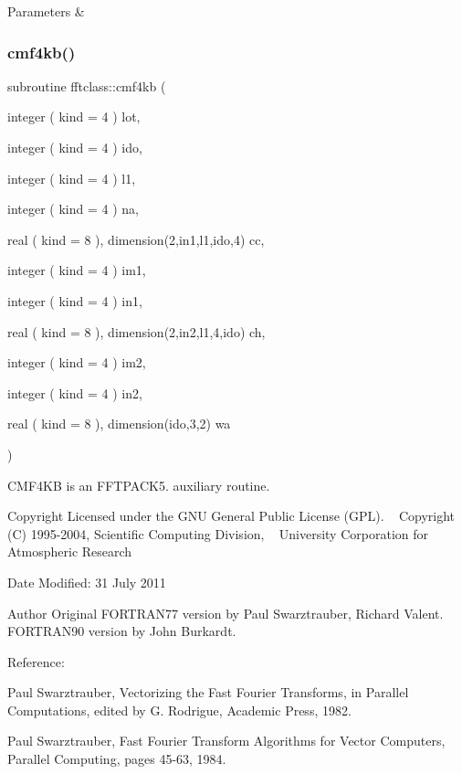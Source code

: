 \begin{DoxyParams}{Parameters}
{\em } & \\
\hline
\end{DoxyParams}
\mbox{\label{namespacefftclass_ad51087e9f2795e7bf337d4c6b55de780}} 
\subsubsection{\texorpdfstring{cmf4kb()}{cmf4kb()}}
{\footnotesize\ttfamily subroutine fftclass\+::cmf4kb (\begin{DoxyParamCaption}\item[{integer ( kind = 4 )}]{lot,  }\item[{integer ( kind = 4 )}]{ido,  }\item[{integer ( kind = 4 )}]{l1,  }\item[{integer ( kind = 4 )}]{na,  }\item[{real ( kind = 8 ), dimension(2,in1,l1,ido,4)}]{cc,  }\item[{integer ( kind = 4 )}]{im1,  }\item[{integer ( kind = 4 )}]{in1,  }\item[{real ( kind = 8 ), dimension(2,in2,l1,4,ido)}]{ch,  }\item[{integer ( kind = 4 )}]{im2,  }\item[{integer ( kind = 4 )}]{in2,  }\item[{real ( kind = 8 ), dimension(ido,3,2)}]{wa }\end{DoxyParamCaption})}



C\+M\+F4\+KB is an F\+F\+T\+P\+A\+C\+K5. auxiliary routine. 

\begin{DoxyCopyright}{Copyright}
Licensed under the G\+NU General Public License (G\+PL). ~\newline
 Copyright (C) 1995-\/2004, Scientific Computing Division, ~\newline
 University Corporation for Atmospheric Research 
\end{DoxyCopyright}
\begin{DoxyDate}{Date}
Modified\+: 31 July 2011 
\end{DoxyDate}
\begin{DoxyAuthor}{Author}
Original F\+O\+R\+T\+R\+A\+N77 version by Paul Swarztrauber, Richard Valent. ~\newline
 F\+O\+R\+T\+R\+A\+N90 version by John Burkardt.
\end{DoxyAuthor}
\begin{DoxyVerb}  Reference:

    Paul Swarztrauber,
    Vectorizing the Fast Fourier Transforms,
    in Parallel Computations,
    edited by G. Rodrigue,
    Academic Press, 1982.

    Paul Swarztrauber,
    Fast Fourier Transform Algorithms for Vector Computers,
    Parallel Computing, pages 45-63, 1984.\end{DoxyVerb}
 

